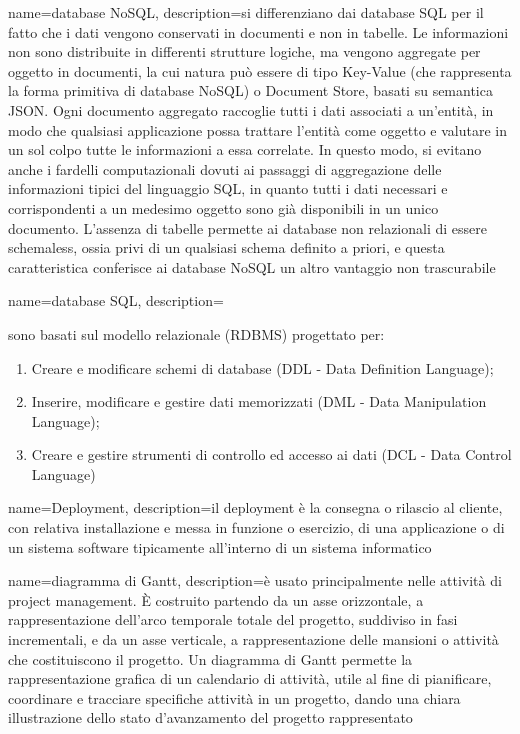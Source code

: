 \hypertarget{D}{}

{
	name=database NoSQL,
	description={si differenziano dai database SQL per il fatto che i dati vengono conservati in documenti e non in tabelle. Le informazioni non sono distribuite in differenti strutture logiche, ma vengono aggregate per oggetto in documenti, la cui natura può essere di tipo Key-Value (che rappresenta la forma primitiva di database NoSQL) o Document Store, basati su semantica JSON. Ogni documento aggregato raccoglie tutti i dati associati a un’entità, in modo che qualsiasi applicazione possa trattare l’entità come oggetto e valutare in un sol colpo tutte le informazioni a essa correlate. In questo modo, si evitano anche i fardelli computazionali dovuti ai passaggi di aggregazione delle informazioni tipici del linguaggio SQL, in quanto tutti i dati necessari e corrispondenti a un medesimo oggetto sono già disponibili in un unico documento. L’assenza di tabelle permette ai database non relazionali di essere schemaless, ossia privi di un qualsiasi schema definito a priori, e questa caratteristica conferisce ai database NoSQL un altro vantaggio non trascurabile}
}

{
	name=database SQL,
	description={sono basati sul modello relazionale (RDBMS) progettato per:
		\begin{enumerate}  
			\item Creare e modificare schemi di database (DDL - Data Definition Language);
			\item Inserire, modificare e gestire dati memorizzati (DML - Data Manipulation Language);
			\item Creare e gestire strumenti di controllo ed accesso ai dati (DCL - Data Control Language)
		\end{enumerate}
	}
}

{
	name=Deployment,
	description={il deployment è la consegna o rilascio al cliente, con relativa installazione e messa in funzione o esercizio, di una applicazione o di un sistema software tipicamente all'interno di un sistema informatico}
}

{
	name=diagramma di Gantt,
	description={è usato principalmente nelle attività di project management. \MakeUppercase{è} costruito partendo da un asse orizzontale, a rappresentazione dell'arco temporale totale del progetto, suddiviso in fasi incrementali, e da un asse verticale, a rappresentazione delle mansioni o attività che costituiscono il progetto. Un diagramma di Gantt permette la rappresentazione grafica di un calendario di attività, utile al fine di pianificare, coordinare e tracciare specifiche attività in un progetto, dando una chiara illustrazione dello stato d'avanzamento del progetto rappresentato}
}

